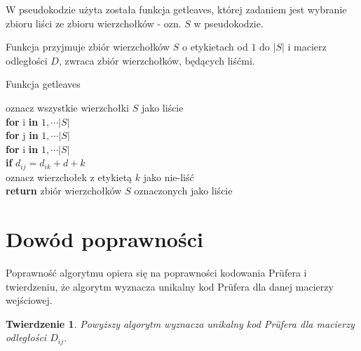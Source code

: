 \documentclass[a4paper,12p]{article}
\newcommand\tab[1][1cm]{\hspace*{#1}}
\begin{document}
W pseudokodzie użyta została funkcja getleaves, której zadaniem jest wybranie zbioru liści ze zbioru wierzchołków - ozn. $S$ w pseudokodzie.

Funkcja przyjmuje zbiór wierzchołków $S$ o etykietach od $1$ do $|S|$ i macierz odległości $D$, zwraca zbiór wierzchołków, będących liśćmi.

\begin{algorithm}
		\caption{Funkcja getleaves}
		\label{algo}
		oznacz wszystkie wierzchołki $S$ jako liście \\
		\textbf{for} i \textbf{in} $1, \cdots |S|$ \\
		\tab \textbf{for} j \textbf{in} $1, \cdots |S|$ \\
		\tab \tab \textbf{for} i \textbf{in} $1, \cdots |S|$ \\
		\tab \tab \tab \textbf{if} $d_{ij} = d_{ik} + d+k$ \\
		\tab \tab \tab \tab oznacz wierzchołek z etykietą $k$ jako nie-liść \\
		\textbf{return} zbiór wierzchołków $S$ oznaczonych jako liście \\
\end{algorithm}

\section{Dowód poprawności}

Poprawność algorytmu opiera się na poprawności kodowania Prüfera i twierdzeniu, że algorytm wyznacza unikalny kod Prüfera dla danej macierzy wejściowej.

\newtheorem{lem}{Twierdzenie}

\begin{lem}
	Powyższy algorytm wyznacza unikalny kod Prüfera dla macierzy odległości $D_{ij}$.
\end{lem}
\end{document}
